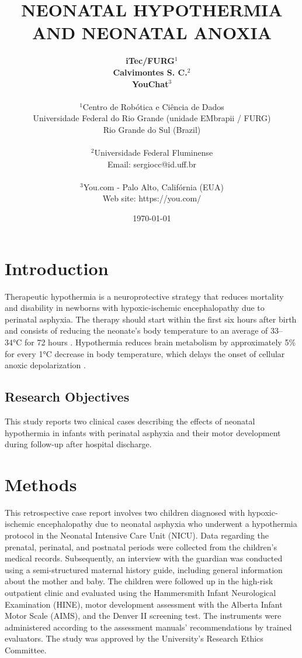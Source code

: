 \documentclass[11pt,a4paper]{article}
\title{\textbf{NEONATAL HYPOTHERMIA AND NEONATAL ANOXIA}}
\author{
	\textbf{iTec/FURG}$^{1}$ \\
	\textbf{Calvimontes S. C.}$^{2}$ \\
	\textbf{YouChat}$^{3}$ \\
	\\
	\small $^{1}$Centro de Robótica e Ciência de Dados \\
	\small Universidade Federal do Rio Grande (unidade EMbrapii / FURG) \\
	\small Rio Grande do Sul (Brazil) \\
	\\
	\small $^{2}$Universidade Federal Fluminense \\
	\small Email: sergiocc@id.uff.br \\
	\\
	\small $^{3}$You.com - Palo Alto, Califórnia (EUA) \\
	\small Web site: https://you.com/
}
\date{\today}
\begin{document}
	
	\maketitle
	
	\newpage
	
	\section{Introduction}
	Therapeutic hypothermia is a neuroprotective strategy that reduces mortality and disability in newborns with hypoxic-ischemic encephalopathy due to perinatal asphyxia. The therapy should start within the first six hours after birth and consists of reducing the neonate's body temperature to an average of 33–34°C for 72 hours \cite{Azzopardi2014, Thayyil2021, Abate2021}. Hypothermia reduces brain metabolism by approximately 5\% for every 1°C decrease in body temperature, which delays the onset of cellular anoxic depolarization \cite{Silveira2015}.
		
	\subsection{Research Objectives}
	This study reports two clinical cases describing the effects of neonatal hypothermia in infants with perinatal asphyxia and their motor development during follow-up after hospital discharge.
	
	\section{Methods}
	This retrospective case report involves two children diagnosed with hypoxic-ischemic encephalopathy due to neonatal asphyxia who underwent a hypothermia protocol in the Neonatal Intensive Care Unit (NICU). Data regarding the prenatal, perinatal, and postnatal periods were collected from the children's medical records. Subsequently, an interview with the guardian was conducted using a semi-structured maternal history guide, including general information about the mother and baby. The children were followed up in the high-risk outpatient clinic and evaluated using the Hammersmith Infant Neurological Examination (HINE), motor development assessment with the Alberta Infant Motor Scale (AIMS), and the Denver II screening test. The instruments were administered according to the assessment manuals' recommendations by trained evaluators. The study was approved by the University's Research Ethics Committee.
	
\end{document}
